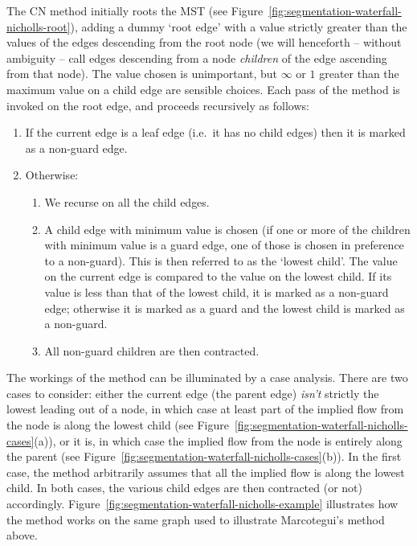 \documentclass[review,a4paper]{elsarticle}
\begin{document}
The CN method initially roots the MST (see Figure~\ref{fig:segmentation-waterfall-nicholls-root}), adding a dummy `root edge' with a value strictly greater than the values of the edges descending from the root node (we will henceforth -- without ambiguity -- call edges descending from a node \emph{children} of the edge ascending from that node). The value chosen is unimportant, but $\infty$ or $1$ greater than the maximum value on a child edge are sensible choices. Each pass of the method is invoked on the root edge, and proceeds recursively as follows:
%
\begin{enumerate}

\item If the current edge is a leaf edge (i.e.~it has no child edges) then it is marked as a non-guard edge.

\item Otherwise:

\begin{enumerate}

\item We recurse on all the child edges.

\item A child edge with minimum value is chosen (if one or more of the children with minimum value is a guard edge, one of those is chosen in preference to a non-guard). This is then referred to as the `lowest child'. The value on the current edge is compared to the value on the lowest child. If its value is less than that of the lowest child, it is marked as a non-guard edge; otherwise it is marked as a guard and the lowest child is marked as a non-guard.

\item All non-guard children are then contracted.

\end{enumerate}

\end{enumerate}

\noindent The workings of the method can be illuminated by a case analysis. There are two cases to consider: either the current edge (the parent edge) \emph{isn't} strictly the lowest leading out of a node, in which case at least part of the implied flow from the node is along the lowest child (see Figure~\ref{fig:segmentation-waterfall-nicholls-cases}(a)), or it is, in which case the implied flow from the node is entirely along the parent (see Figure~\ref{fig:segmentation-waterfall-nicholls-cases}(b)). In the first case, the method arbitrarily assumes that all the implied flow is along the lowest child. In both cases, the various child edges are then contracted (or not) accordingly. Figure~\ref{fig:segmentation-waterfall-nicholls-example} illustrates how the method works on the same graph used to illustrate Marcotegui's method above.
\end{document}
